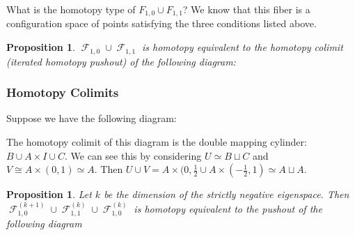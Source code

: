\documentclass{article}
\newtheorem{proposition}[theorem]{Proposition}
\newtheorem{proposed work}[theorem]{Proposed Work}
\DeclareMathOperator{\CF}{\mathcal F}
\begin{document}
What is the homotopy type of $F_{1,0}\cup F_{1,1}$? We know that this fiber is a configuration space of points satisfying the three conditions listed above.\\

\begin{proposition}
$\CF_{1,0}\cup\CF_{1,1}$ is homotopy equivalent to the homotopy colimit (iterated homotopy pushout) of the following diagram:\\
\begin{center}
	\end{center}
\end{proposition}

\subsubsection{Homotopy Colimits}
Suppose we have the following diagram:
\begin{center}
\end{center}

The homotopy colimit of this diagram is the double mapping cylinder: $B\cup A\times I \cup C$. We can see this by considering $U\simeq B\sqcup C$ and $V\cong A\times (0,1)\simeq A$. Then $U\cup V=A\times (0,\frac{1}{2}\cup A\times (-\frac{1}{2},1)\simeq A\sqcup A$.\\

\begin{proposition}
Let $k$ be the dimension of the strictly negative eigenspace. Then $\CF_{1,0}^{(k+1)}\cup \CF_{1,1}^{(k)}\cup \CF_{1,0}^{(k)}$ is homotopy equivalent to the pushout of the following diagram
	\begin{center}
	\end{center}
\end{proposition}
\end{document}
